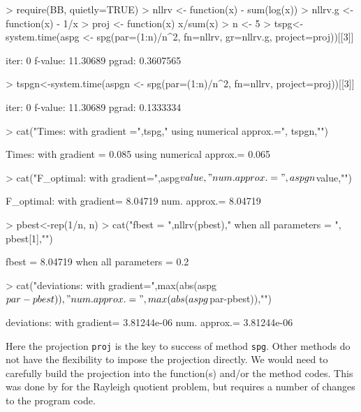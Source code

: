 \documentclass[11pt]{article}
\newcommand{\code}[1]{{\tt#1}}
\begin{document}
\begin{Schunk}
\begin{Sinput}
> require(BB, quietly=TRUE)
> nllrv <- function(x) {- sum(log(x))}
> nllrv.g <- function(x) {- 1/x }
> proj <- function(x) {x/sum(x)}
> n <- 5
> tspg<-system.time(aspg <- spg(par=(1:n)/n^2, fn=nllrv, gr=nllrv.g, project=proj))[[3]]
\end{Sinput}
\begin{Soutput}
iter:  0  f-value:  11.30689  pgrad:  0.3607565 
\end{Soutput}
\begin{Sinput}
> tspgn<-system.time(aspgn <- spg(par=(1:n)/n^2, fn=nllrv, project=proj))[[3]]
\end{Sinput}
\begin{Soutput}
iter:  0  f-value:  11.30689  pgrad:  0.1333334 
\end{Soutput}
\begin{Sinput}
> cat("Times: with gradient =",tspg,"   using numerical approx.=", tspgn,"\n")
\end{Sinput}
\begin{Soutput}
Times: with gradient = 0.085    using numerical approx.= 0.065 
\end{Soutput}
\begin{Sinput}
> cat("F_optimal: with gradient=",aspg$value,"  num. approx.=",aspgn$value,"\n")
\end{Sinput}
\begin{Soutput}
F_optimal: with gradient= 8.04719   num. approx.= 8.04719 
\end{Soutput}
\begin{Sinput}
> pbest<-rep(1/n, n)
> cat("fbest = ",nllrv(pbest),"  when all parameters = ", pbest[1],"\n")
\end{Sinput}
\begin{Soutput}
fbest =  8.04719   when all parameters =  0.2 
\end{Soutput}
\begin{Sinput}
> cat("deviations:  with gradient=",max(abs(aspg$par-pbest)),"   num. approx.=",max(abs(aspg$par-pbest)),"\n")
\end{Sinput}
\begin{Soutput}
deviations:  with gradient= 3.81244e-06    num. approx.= 3.81244e-06 
\end{Soutput}
\end{Schunk}

Here the projection \code{proj} is the key to success of method 
\code{spg}. Other methods do not have the flexibility to impose the projection directly. 
We would need to carefully build the projection into
the function(s) and/or the method codes. 
This was done by \cite{Geradin71} for the Rayleigh quotient 
problem, but requires a number of changes to the program code.
\end{document}
